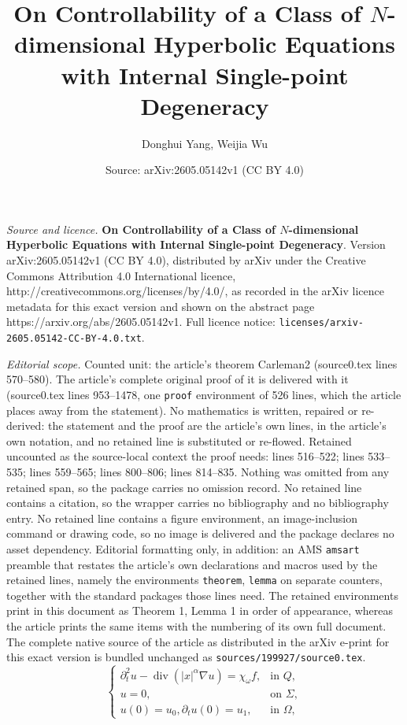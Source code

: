 \documentclass[10pt,a4paper]{amsart}
\title{\bf {\bf On Controllability of a Class of $N$-dimensional Hyperbolic Equations with Internal Single-point Degeneracy}}
\author{Donghui Yang, Weijia Wu}
\date{Source: arXiv:2605.05142v1 (CC BY 4.0)}
\DeclareMathOperator{\Div}{div}
\def\Om{\Omega}
\def\bf{\textbf}
\def\pt{\partial}
\begin{document}
\maketitle

\noindent\emph{Source and licence.} \bf {\bf On Controllability of a Class of $N$-dimensional Hyperbolic Equations with Internal Single-point Degeneracy}. Version arXiv:2605.05142v1 (CC BY 4.0), distributed by arXiv under the Creative Commons Attribution 4.0 International licence, http://creativecommons.org/licenses/by/4.0/, as recorded in the arXiv licence metadata for this exact version and shown on the abstract page https://arxiv.org/abs/2605.05142v1. Full licence notice: \texttt{licenses/arxiv-2605.05142-CC-BY-4.0.txt}.\par\smallskip

\noindent\textit{Editorial scope.} Counted unit: the article's theorem Carleman2 (source0.tex lines 570--580). The article's complete original proof of it is delivered with it (source0.tex lines 953--1478, one \texttt{proof} environment of 526 lines, which the article places away from the statement). No mathematics is written, repaired or re-derived: the statement and the proof are the article's own lines, in the article's own notation, and no retained line is substituted or re-flowed.  Retained uncounted as the source-local context the proof needs: lines 516--522; lines 533--535; lines 559--565; lines 800--806; lines 814--835.  Nothing was omitted from any retained span, so the package carries no omission record.  No retained line contains a citation, so the wrapper carries no bibliography and no bibliography entry.  No retained line contains a figure environment, an image-inclusion command or drawing code, so no image is delivered and the package declares no asset dependency.  Editorial formatting only, in addition: an AMS \texttt{amsart} preamble that restates the article's own declarations and macros used by the retained lines, namely the environments \texttt{theorem}, \texttt{lemma} on separate counters, together with the standard packages those lines need.  The retained environments print in this document as Theorem 1, Lemma 1 in order of appearance, whereas the article prints the same items with the numbering of its own full document.  The complete native source of the article as distributed in the arXiv e-print for this exact version is bundled unchanged as \texttt{sources/199927/source0.tex}.
		\begin{equation}\label{EQ-1}
			\begin{cases}
				\pt_t^2 u-\Div\left(|x|^\alpha \nabla u\right)=\chi_\omega f, & \mbox{in } Q, \\
				u=0, & \mbox{on } \Sigma,\\
				u(0)=u_0, \pt_tu(0)=u_1, &\mbox{in }\Om,
			\end{cases}
		\end{equation}
\end{document}
